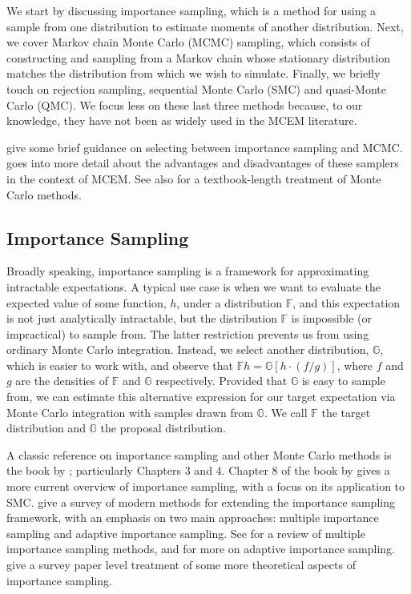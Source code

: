 \documentclass[11pt, oneside]{article}   	%
\newcommand{\bF}{\mathbb{F}}
\newcommand{\bG}{\mathbb{G}}
\begin{document}
We start by discussing importance sampling, which is a method for using a sample from one distribution to estimate moments of another distribution. Next, we cover Markov chain Monte Carlo (MCMC) sampling, which consists of constructing and sampling from a Markov chain whose stationary distribution matches the distribution from which we wish to simulate. Finally, we briefly touch on rejection sampling, sequential Monte Carlo (SMC) and quasi-Monte Carlo (QMC). We focus less on these last three methods because, to our knowledge, they have not been as widely used in the MCEM literature.

\citet{Del99} give some brief guidance on selecting between importance sampling and MCMC. \citet{Jan06II} goes into more detail about the advantages and disadvantages of these samplers in the context of MCEM. See also \citet{Rob04} for a textbook-length treatment of Monte Carlo methods.

\subsection{Importance Sampling}
\label{sec:imp_samp}

Broadly speaking, importance sampling is a framework for approximating intractable expectations. A typical use case is when we want to evaluate the expected value of some function, $h$, under a distribution $\bF$, and this expectation is not just analytically intractable, but the distribution $\bF$ is impossible (or impractical) to sample from. The latter restriction prevents us from using ordinary Monte Carlo integration. Instead, we select another distribution, $\bG$, which is easier to work with, and observe that $\bF h = \bG [h \cdot (f/g)]$, where $f$ and $g$ are the densities of $\bF$ and $\bG$ respectively. Provided that $\bG$ is easy to sample from, we can estimate this alternative expression for our target expectation via Monte Carlo integration with samples drawn from $\bG$. We call $\bF$ the target distribution and $\bG$ the proposal distribution.  

A classic reference on importance sampling and other Monte Carlo methods is the book by \citet{Rob04}; particularly Chapters 3 and 4. Chapter 8 of the book by \citet{Cho20} gives a more current overview of importance sampling, with a focus on its application to SMC. \citet{Elv22} give a survey of modern methods for extending the importance sampling framework, with an emphasis on two main approaches: multiple importance sampling and adaptive importance sampling. See \citet{Elv19} for a review of multiple importance sampling methods, and \citet{Bug17} for more on adaptive importance sampling. \citet{Aga17} give a survey paper level treatment of some more theoretical aspects of importance sampling.
\end{document}

